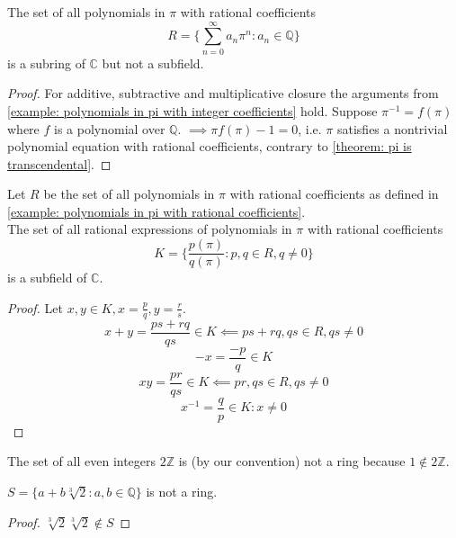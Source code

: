 \begin{examples}
\begin{example} \label{example: polynomials in pi with rational coefficients}
    The set of all polynomials in $\pi$ with rational coefficients
    \[R = \{\sum_{n = 0}^\infty a_n\pi^n : a_n \in \mathbb{Q}\}\]
    is a subring of $\mathbb{C}$ but not a subfield.
\end{example}
\begin{proof}
    For additive, subtractive and multiplicative closure the arguments from \cref{example: polynomials in pi with integer coefficients} hold.
    Suppose $\pi^{-1} = f(\pi)$ where $f$ is a polynomial over $\mathbb{Q}$.
    $\implies \pi f(\pi) - 1 = 0$, i.e. $\pi$ satisfies a nontrivial polynomial equation with rational coefficients,
    contrary to \cref{theorem: pi is transcendental}. 
\end{proof}

\begin{example}
    Let $R$ be the set of all polynomials in $\pi$ with rational coefficients
    as defined in \cref{example: polynomials in pi with rational coefficients}.\\
    The set of all rational expressions of polynomials in $\pi$ with rational coefficients
    \[K = \{\frac{p(\pi)}{q(\pi)} : p,q \in R, q \neq 0\}\]
    is a subfield of $\mathbb{C}$.
\end{example}
\begin{proof}
    Let $x,y \in K,x = \frac{p}{q},y = \frac{r}{s}$.
    \[x + y = \frac{ps + rq}{qs} \in K \impliedby ps + rq,qs \in R,qs \neq 0\]
    \[-x = \frac{-p}{q} \in K\]
    \[xy = \frac{pr}{qs} \in K \impliedby pr,qs \in R,qs \neq 0\]
    \[x^{-1} = \frac{q}{p} \in K : x \neq 0\]
\end{proof}

\begin{example}
    The set of all even integers $2\mathbb{Z}$ is (by our convention) not a ring because $1 \notin 2\mathbb{Z}$.
\end{example}

\begin{example}
    $S = \{a + b\sqrt[3]{2} : a,b \in \mathbb{Q}\}$ is not a ring.
\end{example}
\begin{proof}
    $\sqrt[3]{2}\sqrt[3]{2} \notin S$
\end{proof}
\end{examples}

